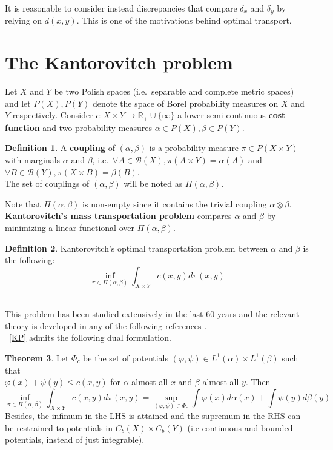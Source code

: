 \documentclass[12pt]{report}
\theoremstyle{definition}
\newtheorem{defi}{Definition}[section]
\newtheorem{thm}[defi]{Theorem}
\theoremstyle{remark}
\begin{document}
It is reasonable to consider instead discrepancies that compare $\delta_x$ and $\delta_y$ by relying on $d(x,y)$. This is one of the motivations behind optimal transport.


\section{The Kantorovitch problem}

\hspace{\parindent} Let $X$ and $Y$ be two Polish spaces (i.e.\ separable and complete metric spaces) and let $P(X), P(Y)$ denote the space of Borel probability measures on $X$ and $Y$ respectively. Consider $c:X\times Y\to \mathbb R_+\cup \{\infty\}$ a lower semi-continuous \textbf{cost function} and two probability measures $\alpha\in P(X), \beta\in P(Y)$. 

\begin{defi}
	A \textbf{coupling} of $(\alpha,\beta)$ is a probability measure $\pi \in P(X\times Y)$ with marginals $\alpha$ and $\beta$, i.e.\
	$\forall A\in \mathcal B(X), \pi(A\times Y)=\alpha(A)$ and $\forall B\in \mathcal B(Y), \pi(X\times B)=\beta(B)$.\\
	The set of couplings of $(\alpha,\beta)$ will be noted as $\Pi(\alpha, \beta)$. 
\end{defi}

Note that $\Pi(\alpha, \beta)$ is non-empty since it contains the trivial coupling $\alpha \otimes \beta$. \textbf{Kantorovitch's mass transportation problem} compares $\alpha$ and $\beta$ by minimizing a linear functional over $\Pi(\alpha, \beta)$.

\begin{defi}
	Kantorovitch's optimal transportation problem between $\alpha$ and $\beta$ is the following:
	\begin{equation}\tag{KP}\label{KP}
	\inf_{\pi\in \Pi(\alpha, \beta)} \int_{X\times Y} c(x,y) d\pi(x,y)
	\end{equation}
\end{defi}
\hfill\\
This problem has been studied extensively in the last 60 years and the relevant theory is developed in any of the following references \cite{rachev1998mass,villani2003topics,villani2008optimal,santambrogio2015optimal}.\\
~\eqref{KP} admits the following dual formulation. 

\begin{thm}
	Let $\Phi_c$ be the set of potentials $(\varphi, \psi)\in L^1(\alpha)\times L^1(\beta)$ such that\\ $\varphi(x)+\psi(y)\leq c(x,y)$ for $\alpha$-almost all $x$ and $\beta$-almost all $y$. Then
	\begin{equation}\tag{KP-dual}\label{KPdual}
	\inf_{\pi\in \Pi(\alpha, \beta)} \int_{X\times Y} c(x,y) d\pi(x,y) = \sup_{(\varphi, \psi)\in \Phi_c} \int \varphi(x) d\alpha(x) + \int \psi(y) d\beta(y)
	\end{equation}
	Besides, the infimum in the LHS is attained and the supremum in the RHS can be restrained to potentials in $C_b(X)\times C_b(Y)$ (i.e continuous and bounded potentials, instead of just integrable).
\end{thm}
\end{document}
